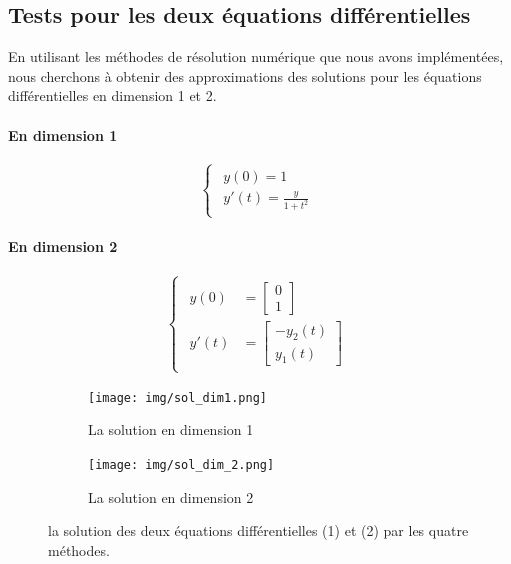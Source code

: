 \documentclass{article}
\begin{document}
\subsection{Tests pour les deux équations différentielles\\}

En utilisant les méthodes de résolution numérique que nous avons implémentées, nous cherchons à obtenir des approximations des solutions pour les équations différentielles en dimension 1 et 2.


\paragraph{En dimension 1}
\begin{equation}
\begin{cases}
\begin{aligned}
    y(0) = 1 \\
    y'(t) = \frac{y}{1+t^{2}}  
\end{aligned}
\end{cases}
\end{equation}




\paragraph{En dimension 2}

\begin{equation}
\begin{cases}
\begin{aligned}
y(0) &= \begin{bmatrix} 0 \\ 1 \end{bmatrix}\\
y'(t) &= \begin{bmatrix} -y_{2}(t) \\ y_{1}(t) \end{bmatrix} 
\end{aligned}
\end{cases}
\end{equation}


\begin{figure}[h]
    \centering
    \begin{subfigure}{0.44\textwidth}
        \centering
        \texttt{[image: img/sol\_dim1.png]}
       \caption{La solution en dimension 1}
        \label{fig:dim1}
    \end{subfigure}
    \begin{subfigure}{0.44\textwidth}
        \centering
    \texttt{[image: img/sol\_dim\_2.png]}
    \caption{La solution en dimension 2}
    \label{fig:dim2}
    \end{subfigure}
    \caption{la solution des deux équations différentielles (1) et (2) par les quatre méthodes.}
    \label{fig:ensemble}
\end{figure}
\end{document}
